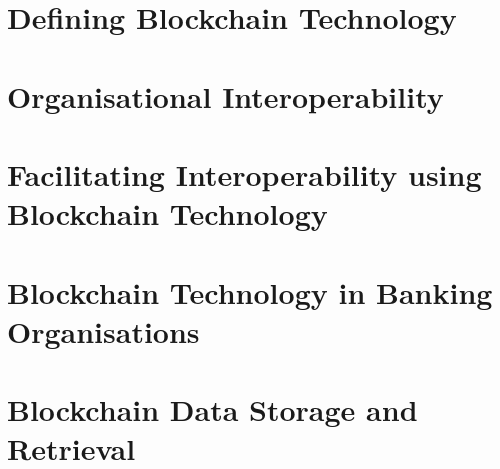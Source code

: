 \section{Defining Blockchain Technology}
\autocite{champagneBookSatoshiCollected2014}

\section{Organisational Interoperability}

\section{Facilitating Interoperability using Blockchain Technology}

\section{Blockchain Technology in Banking Organisations}

\section{Blockchain Data Storage and Retrieval}